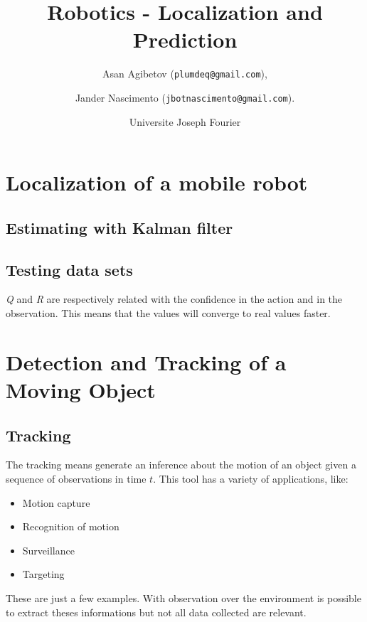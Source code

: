 \documentclass{article}
\begin{document}
\title{Robotics - Localization and Prediction}

\author{Asan Agibetov (\texttt{plumdeq@gmail.com}), 
\and Jander Nascimento (\texttt{jbotnascimento@gmail.com}).
\and Universite Joseph Fourier}

\maketitle

\section{Localization of a mobile robot}

\subsection{Estimating with Kalman filter}

\subsection{Testing data sets}
\emph{Q} and \emph{R} are respectively related with the confidence in the action and in the observation. This means that the values will converge to real values faster.

\section{Detection and Tracking of a Moving Object}

\subsection{Tracking}

The tracking means generate an inference about the motion of an object given a sequence of observations in time $t$. This tool has a variety of applications, like:

\begin{itemize}
\item Motion capture
\item Recognition of motion
\item Surveillance
\item Targeting
\end{itemize}

These are just a few examples. With observation over the environment is possible to extract theses informations but not all data collected are relevant. 
\end{document}
